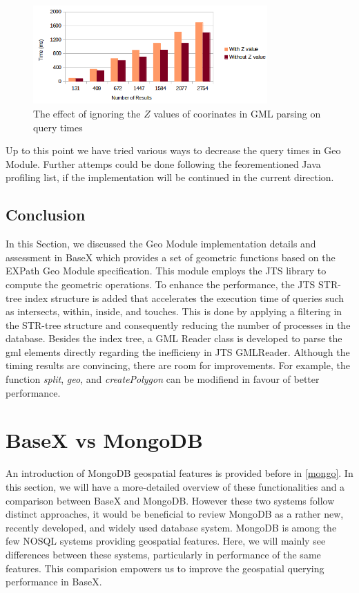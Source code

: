 \documentclass[a4paper,12pt]{article}
\begin{document}
\begin{figure}
\centering
\includegraphics[width=0.8\textwidth,height=0.2\textheight]{BXZvalue}
\caption{The effect of ignoring the $Z$ values of coorinates in GML parsing on query times}
\label{figBXZvalue}
\end{figure}

Up to this point we have tried various ways to decrease the query times in Geo Module. Further attemps could be done following the feorementioned Java profiling list, if the implementation will be continued in the current direction.

\subsection{Conclusion}
\label{BXconc}
In this Section, we discussed the Geo Module implementation details and assessment in BaseX which provides a set of geometric functions based on the EXPath Geo Module specification. This module employs the JTS library to compute the geometric operations. To enhance the performance, the JTS STR-tree index structure is added that accelerates the execution time of queries such as intersects, within, inside, and touches. This is done by applying a filtering in the STR-tree structure and consequently reducing the number of processes in the database. Besides the index tree, a GML Reader class is developed to parse the gml elements directly regarding the inefficieny in JTS GMLReader. Although the timing results are convincing, there are room for improvements. For example, the function \textit{split}, \textit{geo}, and \textit{createPolygon} can be modifiend in favour of better performance.

\newpage
\section{BaseX vs MongoDB}
\label{s.mongo}

An introduction of MongoDB geospatial features is provided before in \ref{mongo}. In this section, we will have a more-detailed overview of these functionalities and a comparison between BaseX and MongoDB. However these two systems follow distinct approaches, it would be beneficial to review MongoDB as a rather new, recently developed, and widely used database system. MongoDB is among the few NOSQL systems providing geospatial features. Here, we will mainly see differences between these systems, particularly in performance of the same features. This comparision empowers us to improve the geospatial querying performance in BaseX. 
\end{document}
